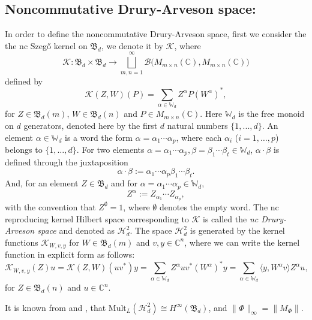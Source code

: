 \documentclass[12pt]{amsart}%
\numberwithin{equation}{section}
\newcommand{\cB}{\mathcal{B}}
\newcommand{\cF}{\mathcal{F}}
\newcommand{\cH}{\mathcal{H}}
\newcommand{\cK}{\mathcal{K}}
\newcommand{\bC}{\mathbb{C}}
\newcommand{\bW}{\mathbb{W}}
\newcommand{\fB}{{\mathfrak{B}}}
\newcommand{\clh}{\mathcal{H}}
\newcommand{\clk}{\mathcal{K}}
\begin{document}
 \subsection{Noncommutative Drury-Arveson space:}\label{Sub: nc Drury} In order to define the noncommutative Drury-Arveson space, first we consider the the nc Szeg\H o kernel on $\fB_d$, we denote it by $\clk$, where
    \[
   \clk:\fB_d\times\fB_d\to\bigsqcup_{m,n=1}^{\infty} \cB\big(M_{m\times n}(\bC), M_{m\times n}(\bC)\big) 
    \]
    defined by
    \[
   \clk(Z,W)(P)=\sum_{\alpha\in \bW_d}Z^\alpha P(W^\alpha)^*,
    \]
     for $Z\in\fB_d(m)$, $W\in \fB_d(n)$ and $P\in M_{m\times n}(\bC)$. Here $\bW_d$ is the free monoid on $d$ generators, denoted here by the first $d$ natural numbers $\{1,...,d\}$. An element $\alpha\in\bW_d$ is a word the form $\alpha=\alpha_1\cdots \alpha_p$, where each $\alpha_i$ ($i=1,\ldots,p$) belongs to $\{1,\ldots,d\}$. For two elements $\alpha=\alpha_1\cdots \alpha_p, \beta=\beta_1\cdots \beta_t\in \bW_d$, $\alpha\cdot \beta$ is defined through the juxtaposition
     \[
     \alpha\cdot \beta:=\alpha_1\cdots \alpha_p\beta_1\cdots \beta_t.
     \]
    And, for an element $Z\in \fB_d$ and for $\alpha=\alpha_1\cdots \alpha_p\in \bW_d$,
    \[
    Z^{\alpha}:=Z_{\alpha_1}\cdots Z_{\alpha_p},
    \]
    with the convention that $Z^{\emptyset}=1$, where $\emptyset$ denotes the empty word.
     The nc reproducing kernel Hilbert space corresponding to $\cK$ is called the \textit{nc Drury-Arveson space} and denoted as $\cH^2_d$.  The space $\cH^2_d$ is generated by the kernel functions $\cK_{W,v,y}$ for $W\in\fB_d(m)$ and $v,y\in\bC^n$, where we can write the kernel function in explicit form as follows:
     \begin{equation}\label{Drury explicit}
    \clk_{W,v,y}(Z)u=\clk(Z,W)(uv^*)y=\sum_{\alpha\in\bW_d}Z^\alpha uv^*(W^\alpha)^*y=\sum_{\alpha\in\bW_d}\langle y, W^\alpha v\rangle Z^\alpha u,
     \end{equation}
for $Z\in\fB_d(n)$ and $u\in\bC^n$. 

It is known from  \cite[Corollary 3.7]{SSS} and \cite[Theorem 5.5]{BMV18}, that $\text{Mult}_L(\clh^2_d)\cong H^\infty(\fB_d)$, and $\|\Phi\|_\infty=\|M_\Phi\|$.
\end{document}
